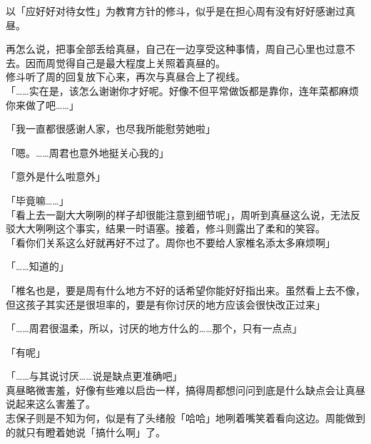 以「应好好对待女性」为教育方针的修斗，似乎是在担心周有没有好好感谢过真昼。

再怎么说，把事全部丢给真昼，自己在一边享受这种事情，周自己心里也过意不去。因而周觉得自己是最大程度上关照着真昼的。\\

修斗听了周的回复放下心来，再次与真昼合上了视线。\\

「……实在是，该怎么谢谢你才好呢。好像不但平常做饭都是靠你，连年菜都麻烦你来做了吧……」

「我一直都很感谢人家，也尽我所能慰劳她啦」

「嗯。……周君也意外地挺关心我的」

「意外是什么啦意外」

「毕竟嘛……」\\

「看上去一副大大咧咧的样子却很能注意到细节呢」，周听到真昼这么说，无法反驳大大咧咧这个事实，结果一时语塞。接着，修斗则露出了柔和的笑容。\\

「看你们关系这么好就再好不过了。周你也不要给人家椎名添太多麻烦啊」

「……知道的」

「椎名也是，要是周有什么地方不好的话希望你能好好指出来。虽然看上去不像，但这孩子其实还是很坦率的，要是有你讨厌的地方应该会很快改正过来」

「……周君很温柔，所以，讨厌的地方什么的……那个，只有一点点」

「有呢」

「……与其说讨厌……说是缺点更准确吧」\\

真昼略微害羞，好像有些难以启齿一样，搞得周都想问问到底是什么缺点会让真昼说起来这么害羞了。\\

志保子则是不知为何，似是有了头绪般「哈哈」地咧着嘴笑着看向这边。周能做到的就只有瞪着她说「搞什么啊」了。
